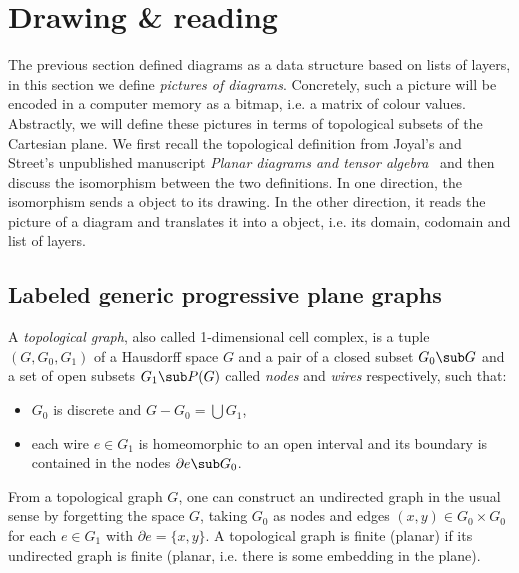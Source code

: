 
\section{Drawing \& reading}

The previous section defined diagrams as a data structure based on lists of layers, in this section we define \emph{pictures of diagrams}.
Concretely, such a picture will be encoded in a computer memory as a bitmap, i.e. a matrix of colour values.
Abstractly, we will define these pictures in terms of topological subsets of the Cartesian plane.
We first recall the topological definition from Joyal's and Street's unpublished manuscript \emph{Planar diagrams and tensor algebra}~\cite{JoyalStreet88} and then discuss the isomorphism between the two definitions.
In one direction, the isomorphism sends a  object to its drawing.
In the other direction, it reads the picture of a diagram and translates it into a  object, i.e. its domain, codomain and list of layers.

\subsection{Labeled generic progressive plane graphs}

A \emph{topological graph}, also called 1-dimensional cell complex, is a tuple $(G, G_0, G_1)$ of a Hausdorff space $G$ and a pair of a closed subset $G_0 \sub G$ and a set of open subsets $G_1 \sub P(G)$ called \emph{nodes} and \emph{wires} respectively, such that:
\begin{itemize}
\item $G_0$ is discrete and $G - G_0 = \bigcup G_1$,
\item each wire $e \in G_1$ is homeomorphic to an open interval and its boundary is contained in the nodes $\partial e \sub G_0$.
\end{itemize}
From a topological graph $G$, one can construct an undirected graph in the usual sense by forgetting the space $G$, taking $G_0$ as nodes and edges $(x, y) \in G_0 \times G_0$ for each $e \in G_1$ with $\partial e = \{ x, y \}$.
A topological graph is finite (planar) if its undirected graph is finite (planar, i.e. there is some embedding in the plane).

